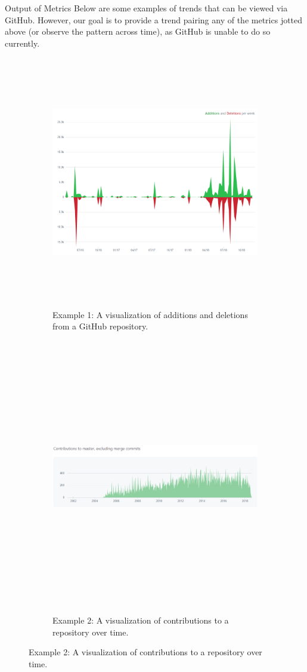 \documentclass[22pt]{beamer}
\begin{document}
\begin{frame}[fragile]
\begin{textblock}{7.25}
\begin{block}{Output of Metrics}
Below are some examples of trends that can be viewed via GitHub. However, our goal is to provide a trend pairing any of the metrics jotted above (or observe the pattern across time), as GitHub is unable to do so currently. 

\begin{figure}
  \begin{subfigure}{0.40\textwidth}
    \includegraphics[height=11cm]{AddDeleteVisual1.png}
        \caption*{Example 1: A visualization of additions and deletions from a GitHub repository. }
  \end{subfigure}
  \begin{subfigure}{0.40\textwidth}
    \includegraphics[height=12cm, width = 18cm]{Contributions.png}
        \caption*{Example 2: A visualization of contributions to a repository over time. }
    \end{subfigure}
 \end{figure}


\end{block}
\end{textblock}
\end{frame}
\end{document}
